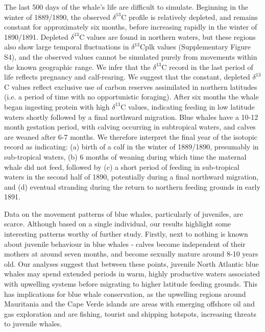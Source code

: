 \documentclass[a4paper,12pt]{article}
\begin{document}
The last 500 days of the whale's life are difficult to simulate. 
Beginning in the winter of 1889/1890, the observed $\delta^{13}$C profile is relatively depleted, and remains constant for approximately six months, before increasing rapidly in the winter of 1890/1891. 
Depleted $\delta^{13}$C values are found in northern waters, but these regions also show large temporal fluctuations in $\delta^{13}$Cplk values (Supplementary Figure S4), and the observed values cannot be simulated purely from movements within the known geographic range.
We infer that the $\delta^{13}$C record in the last period of life reflects pregnancy and calf-rearing. 
We suggest that the constant, depleted $\delta^{13}$C values reflect exclusive use of carbon reserves assimilated in northern latitudes (i.e. a period of time with no opportunistic foraging). 
After six months the whale began ingesting protein with high $\delta^{13}$C  values, indicating feeding in low latitude waters shortly followed by a final northward migration. 
Blue whales have a 10-12 month gestation period, with calving occurring in subtropical waters, and calves are weaned after 6-7 months\cite{handbook}. 
We therefore interpret the final year of the isotopic record as indicating: (a) birth of a calf in the winter of 1889/1890, presumably in sub-tropical waters, (b) 6 months of weaning during which time the maternal whale did not feed, followed by (c) a short period of feeding in sub-tropical waters in the second half of 1890, potentially during a final northward migration, and (d) eventual stranding during the return to northern feeding grounds in early 1891.

Data on the movement patterns of blue whales, particularly of juveniles, are scarce. 
Although based on a single individual, our results highlight some interesting patterns worthy of further study.
Firstly, next to nothing is known about juvenile behaviour in blue whales - calves become independent of their mothers at around seven months, and become sexually mature around 8-10 years old\cite{handbook}.
Our analyses suggest that between these points, juvenile North Atlantic blue whales may spend extended periods in warm, highly productive waters associated with upwelling systems before migrating to higher latitude feeding grounds.
This has implications for blue whale conservation, as the upwelling regions around Mauritania and the Cape Verde islands are areas with emerging offshore oil and gas exploration and are fishing, tourist and shipping hotspots, increasing threats to juvenile whales. 
\end{document}
